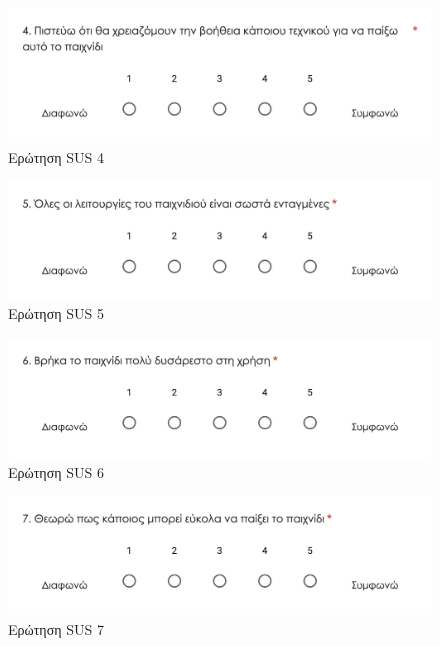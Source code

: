 \begin{figure}[H]
    \centering
    \includegraphics[width=0.8\linewidth]{sections/appendices/b/images/survey_sus_4}
    \caption{Ερώτηση SUS 4}
    \label{fig:survey_sus_4}
\end{figure}

\begin{figure}[H]
    \centering
    \includegraphics[width=0.8\linewidth]{sections/appendices/b/images/survey_sus_5}
    \caption{Ερώτηση SUS 5}
    \label{fig:survey_sus_5}
\end{figure}

\begin{figure}[H]
    \centering
    \includegraphics[width=0.8\linewidth]{sections/appendices/b/images/survey_sus_6}
    \caption{Ερώτηση SUS 6}
    \label{fig:survey_sus_6}
\end{figure}

\begin{figure}[H]
    \centering
    \includegraphics[width=0.8\linewidth]{sections/appendices/b/images/survey_sus_7}
    \caption{Ερώτηση SUS 7}
    \label{fig:survey_sus_7}
\end{figure}

